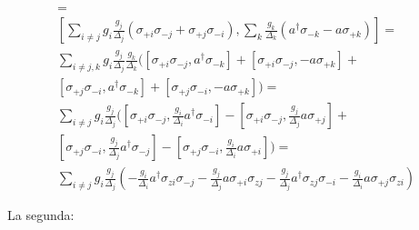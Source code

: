 \begin{multline}
[\sum\limits_{ij} g_i \frac{g_j}{\Delta_j} \left(\sigma_{+i} \sigma_{-j} + \sigma_{+j} \sigma_{-i}\right), \sum\limits_k \frac{g_k} {\Delta_k} (a^\dagger \sigma_{-k} - a \sigma_{+k})] = \\
[\sum\limits_{i \neq j} g_i \frac{g_j}{\Delta_j} \left(\sigma_{+i} \sigma_{-j} + \sigma_{+j} \sigma_{-i}\right), \sum\limits_k \frac{g_k} {\Delta_k} (a^\dagger \sigma_{-k} - a \sigma_{+k})] = \\
\sum\limits_{i \neq j, k} g_i \frac{g_j}{\Delta_j} \frac{g_k}{\Delta_k} (
[\sigma_{+i} \sigma_{-j},  a^\dagger \sigma_{-k}] +
[\sigma_{+i} \sigma_{-j},  - a \sigma_{+k}] + \\
[\sigma_{+j} \sigma_{-i},  a^\dagger \sigma_{-k}] +
[\sigma_{+j} \sigma_{-i}, - a \sigma_{+k}] ) = \\
\sum\limits_{i \neq j} g_i \frac{g_j}{\Delta_j} (
[\sigma_{+i} \sigma_{-j}, \frac{g_i}{\Delta_i}  a^\dagger \sigma_{-i}] -
[\sigma_{+i} \sigma_{-j}, \frac{g_j}{\Delta_j} a \sigma_{+j}] + \\
[\sigma_{+j} \sigma_{-i}, \frac{g_j}{\Delta_j} a^\dagger \sigma_{-j}] -
[\sigma_{+j} \sigma_{-i}, \frac{g_i}{\Delta_i} a \sigma_{+i}] ) = \\
\sum\limits_{i \neq j} g_i \frac{g_j}{\Delta_j} \left(
- \frac{g_i}{\Delta_i} a^\dagger \sigma_{zi} \sigma_{-j}
- \frac{g_j}{\Delta_j} a \sigma_{+i} \sigma_{zj}
- \frac{g_j}{\Delta_j} a^\dagger \sigma_{zj} \sigma_{-i}
- \frac{g_i}{\Delta_i} a \sigma_{+j} \sigma_{zi} \right)
\end{multline}

La segunda:

